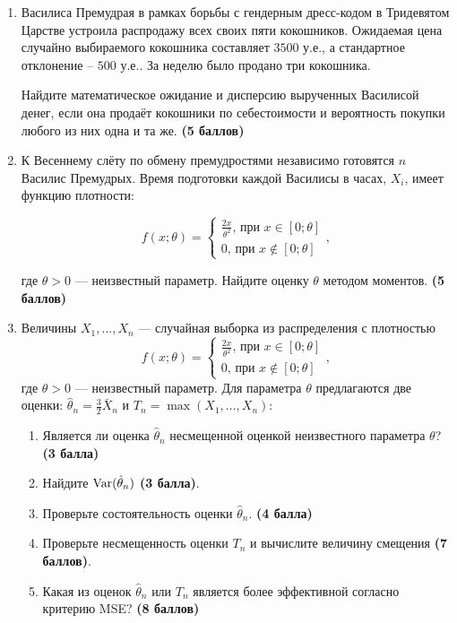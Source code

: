 \begin{enumerate}[resume]

\item Василиса Премудрая в рамках борьбы с гендерным дресс-кодом в Тридевятом Царстве устроила распродажу всех своих пяти кокошников. 
Ожидаемая цена случайно выбираемого кокошника составляет $3500$ у.е., а стандартное отклонение – $500$ у.е.. За неделю было продано три кокошника.

Найдите математическое ожидание и дисперсию вырученных Василисой денег, если она продаёт кокошники по себестоимости и вероятность покупки любого из них одна и та же. \textbf{(5 баллов)}

\item К Весеннему слёту по обмену премудростями
независимо готовятся $n$ Василис Премудрых.
Время подготовки каждой Василисы в часах, $X_{i}$,
имеет функцию плотности:


\[
f(x;\theta)=\begin{cases}
  \frac{2x}{\theta^2}\text{, при }x\in[0;\theta]\\
  0\text{, при }x\notin[0;\theta]
\end{cases},
\]

где $\theta>0$ — неизвестный параметр.
Найдите оценку $\theta$ методом моментов. \textbf{(5 баллов)}

\item Величины $X_{1}, \ldots, X_{n}$ — случайная выборка из распределения с плотностью
\[
f(x;\theta)=\begin{cases}
  \frac{2x}{\theta^2}\text{, при }x\in[0;\theta]\\
  0\text{, при }x\notin[0;\theta]
\end{cases},
\]
где $\theta>0$ — неизвестный параметр. Для параметра $\theta$ предлагаются две оценки: $\hat{\theta}_{n}=\frac{3}{2}\bar X_n$ и $T_n=\max(X_{1}, \ldots, X_{n})$:

\begin{enumerate}
\item Является ли оценка $\hat{\theta}_{n}$ несмещенной оценкой неизвестного параметра $\theta$? \textbf{(3 балла)}
\item Найдите $\operatorname{Var}(\hat{\theta}_{n})$ \textbf{(3 балла)}.
\item Проверьте состоятельность оценки $\hat{\theta}_{n}$.
\textbf{(4 балла)}
\item Проверьте несмещенность оценки $T_{n}$ и вычислите величину смещения \textbf{(7 баллов)}.
\item Какая из оценок $\hat{\theta}_{n}$ или $T_{n}$ является более эффективной согласно критерию MSE? \textbf{(8 баллов)}
\end{enumerate}


\end{enumerate}
